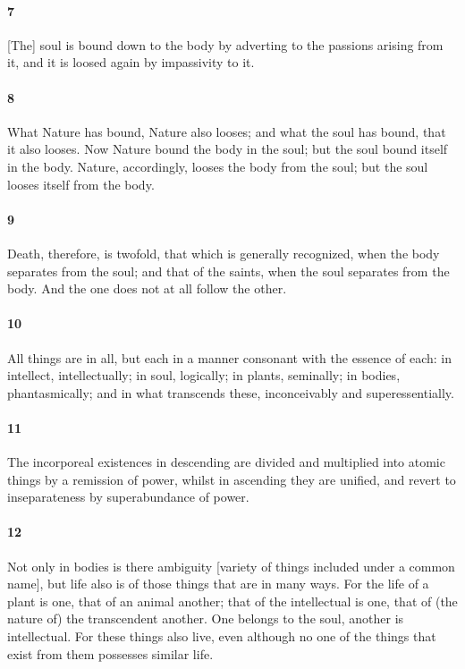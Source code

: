 \documentclass[12pt]{article}
\begin{document}
\paragraph{7} [The] soul is bound down to the body by adverting to the passions
arising from it, and it is loosed again by impassivity to it.

\paragraph{8} What Nature has bound, Nature also looses; and what the soul has
bound, that it also looses. Now Nature bound the body in the soul; but the soul
bound itself in the body. Nature, accordingly, looses the body from the soul;
but the soul looses itself from the body.

\paragraph{9} Death, therefore, is twofold, that which is generally recognized,
when the body separates from the soul; and that of the saints, when the soul
separates from the body. And the one does not at all follow the other.

\paragraph{10} All things are in all, but each in a manner consonant with the
es\-sence of each: in intellect, intellectually; in soul, logically; in plants,
seminally; in bodies, phantasmically; and in what transcends these,
inconceivably and superessentially.

\paragraph{11} The incorporeal existences in descending are divided and
multiplied into atomic things by a remission of power, whilst in ascending they
are unified, and revert to inseparateness by superabundance of power.

\paragraph{12} Not only in bodies is there ambiguity [variety of things
included under a common name], but life also is of those things that are in
many ways. For the life of a plant is one, that of an animal another; that of
the intellectual is one, that of (the nature of) the transcendent another. One
belongs to the soul, another is intellectual. For these things also live, even
although no one of the things that exist from them possesses similar life.
\end{document}
